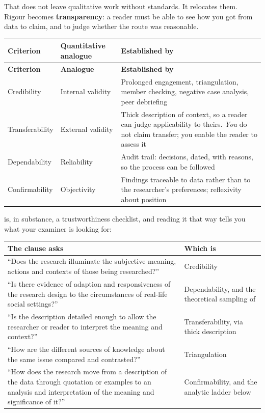 That does not leave qualitative work without standards. It relocates them.
Rigour becomes \textbf{transparency}: a reader must be able to see how you got
from data to claim, and to judge whether the route was reasonable.

\begin{center}
\small
\begin{longtable}{@{}L{3.0cm}L{4.4cm}L{6.6cm}@{}}
\toprule
\textbf{Criterion} & \textbf{Quantitative analogue} & \textbf{Established by} \\
\midrule
\endfirsthead
\toprule
\textbf{Criterion} & \textbf{Analogue} & \textbf{Established by} \\
\midrule
\endhead
\bottomrule
\endfoot
Credibility
  & Internal validity
  & Prolonged engagement, triangulation, member checking, negative case
    analysis, peer debriefing \\
Transferability
  & External validity
  & Thick description of context, so a reader can judge applicability to
    theirs. \emph{You} do not claim transfer; you enable the reader to assess it \\
Dependability
  & Reliability
  & Audit trail: decisions, dated, with reasons, so the process can be followed \\
Confirmability
  & Objectivity
  & Findings traceable to data rather than to the researcher's preferences;
    reflexivity about position \\
\end{longtable}
\end{center}

\begin{conceptbox}
 is, in substance, a trustworthiness checklist,
and reading it that way tells you what your examiner is looking for:

\begin{center}
\small
\begin{tabular}{@{}L{6.6cm}L{7.4cm}@{}}
\toprule
\textbf{The clause asks} & \textbf{Which is} \\
\midrule
``Does the research illuminate the subjective meaning, actions and contexts of
those being researched?'' & Credibility \\
``Is there evidence of adaption and responsiveness of the research design to
the circumstances of real-life social settings?'' & Dependability, and the
theoretical sampling of  \\
``Is the description detailed enough to allow the researcher or reader to
interpret the meaning and context?'' & Transferability, via thick description \\
``How are the different sources of knowledge about the same issue compared and
contrasted?'' & Triangulation \\
``How does the research move from a description of the data through quotation
or examples to an analysis and interpretation of the meaning and significance
of it?'' & Confirmability, and the analytic ladder below \\
\bottomrule
\end{tabular}
\end{center}
\end{conceptbox}

